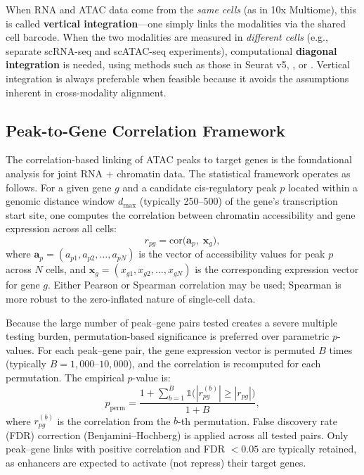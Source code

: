 \begin{keyconcept}[title={Vertical vs.\ Diagonal Integration}]
When RNA and ATAC data come from the \textit{same cells} (as in 10x Multiome), this is called \textbf{vertical integration}---one simply links the modalities via the shared cell barcode. When the two modalities are measured in \textit{different cells} (e.g., separate scRNA-seq and scATAC-seq experiments), computational \textbf{diagonal integration} is needed, using methods such as those in Seurat v5, , or . Vertical integration is always preferable when feasible because it avoids the assumptions inherent in cross-modality alignment.
\end{keyconcept}

\subsection{Peak-to-Gene Correlation Framework}
\label{subsec:multiomics:peak-gene-correlation}

The correlation-based linking of ATAC peaks to target genes is the foundational analysis for joint RNA + chromatin data. The statistical framework operates as follows. For a given gene $g$ and a candidate cis-regulatory peak $p$ located within a genomic distance window $d_{\max}$ (typically 250--500\kilobase{}) of the gene's transcription start site, one computes the correlation between chromatin accessibility and gene expression across all cells:
\begin{equation}
  r_{pg} = \text{cor}\bigl(\mathbf{a}_p,\; \mathbf{x}_g\bigr),
  \label{eq:multiomics:peak-gene-corr}
\end{equation}
where $\mathbf{a}_p = (a_{p1}, a_{p2}, \ldots, a_{pN})$ is the vector of accessibility values for peak $p$ across $N$ cells, and $\mathbf{x}_g = (x_{g1}, x_{g2}, \ldots, x_{gN})$ is the corresponding expression vector for gene $g$. Either Pearson or Spearman correlation may be used; Spearman is more robust to the zero-inflated nature of single-cell data.

\begin{keyconcept}[title={Significance Testing by Permutation}]
Because the large number of peak--gene pairs tested creates a severe multiple testing burden, permutation-based significance is preferred over parametric $p$-values. For each peak--gene pair, the gene expression vector is permuted $B$ times (typically $B = 1{,}000$--$10{,}000$), and the correlation is recomputed for each permutation. The empirical $p$-value is:
\begin{equation}
  p_{\text{perm}} = \frac{1 + \sum_{b=1}^{B} \mathbb{1}\bigl(|r^{(b)}_{pg}| \geq |r_{pg}|\bigr)}{1 + B},
  \label{eq:multiomics:perm-pvalue}
\end{equation}
where $r^{(b)}_{pg}$ is the correlation from the $b$-th permutation. False discovery rate (FDR) correction (Benjamini--Hochberg) is applied across all tested pairs. Only peak--gene links with positive correlation and FDR $< 0.05$ are typically retained, as enhancers are expected to activate (not repress) their target genes.
\end{keyconcept}

